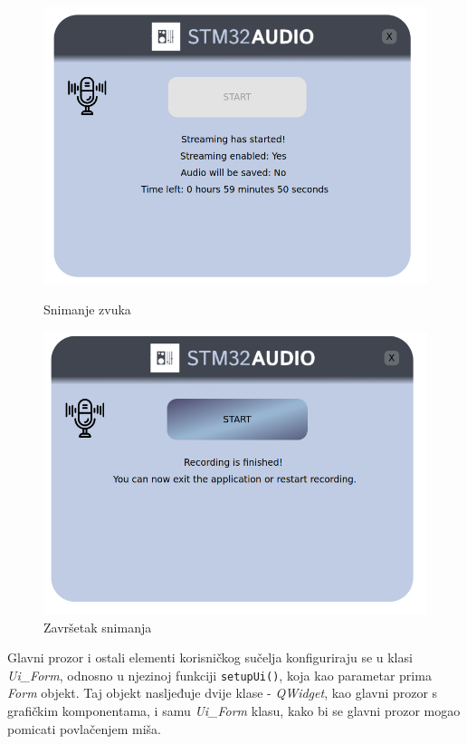 \begin{figure}[ht]
	\begin{minipage}[t]{0.4\textwidth}
	\includegraphics[width=\linewidth]{imgs/recording_form_3}
	\caption{Snimanje zvuka}
	\label{fig:recording_form_3}
	\end{minipage}
	\hspace*{\fill}
	\begin{minipage}[t]{0.4\textwidth}
		\includegraphics[width=\linewidth]{imgs/recording_form_4}
		\caption{Završetak snimanja}
		\label{fig:recording_form_4}
	\end{minipage}
\end{figure}


Glavni prozor i ostali elementi korisničkog sučelja konfiguriraju se u klasi \textit{Ui\_Form}, odnosno u njezinoj funkciji \lstinline|setupUi()|, koja kao parametar prima \textit{Form} objekt. Taj objekt nasljeđuje dvije klase - \textit{QWidget}, kao glavni prozor s grafičkim komponentama, i samu \textit{Ui\_Form} klasu, kako bi se glavni prozor mogao pomicati povlačenjem miša. 


